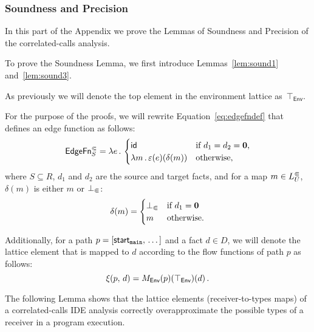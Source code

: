 \subsubsection{Soundness and Precision}

In this part of the Appendix we prove the Lemmas of Soundness and Precision of the correlated-calls analysis.

To prove the Soundness Lemma, we first introduce Lemmas~\ref{lem:sound1} and~\ref{lem:sound3}.

As previously we will denote the top element in the environment lattice as~$\top_\textsf{Env}$.

For the purpose of the proofs, we will rewrite Equation~\eqref{eq:edgefndef} that defines an edge function as follows:
  \begin{equation}\label{eq:edgefnThroughDelta}
    \textsf{EdgeFn}^\Subset_{S}=\lambda e\,.\,
    \begin{cases}
      \textsf{id}&\text{if $d_1=d_2=\mathbf0$,}\\
      \lambda m\,.\,\varepsilon(e)(\delta(m))&\text{otherwise},
    \end{cases}
  \end{equation}
  where $S\subseteq R$, $d_1$ and $d_2$ are the source and target facts, and for a map $m\in L^\Subset_U$, $\delta(m)$ is either $m$ or $\bot_\Subset$:
  \begin{equation}\label{eq:deltadef}
    \delta(m)=\begin{cases}
      \bot_\Subset&\text{if $d_1=\mathbf0$}\\
      m&\text{otherwise.}
    \end{cases}
  \end{equation}

Additionally, for a path $p=[\textsf{start}_\texttt{main},\,\dots]$ and a fact $d\in D$, we will denote the lattice element that is mapped to $d$ according to the flow functions of path $p$ as follows:
\begin{equation}
  \xi(p,\,d)=M_\textsf{Env}(p)(\top_\textsf{Env})(d)\,.
\end{equation}

The following Lemma shows that the lattice elements (receiver-to-types maps) of a correlated-calls IDE analysis correctly overapproximate the possible types of a receiver in a program execution.

